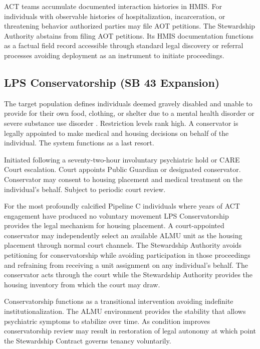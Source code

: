 \documentclass[12pt, letterpaper]{article}
\begin{document}
ACT teams accumulate documented interaction histories in HMIS. For individuals with observable histories of hospitalization, incarceration, or threatening behavior authorized parties may file AOT petitions. The Stewardship Authority abstains from filing AOT petitions. Its HMIS documentation functions as a factual field record accessible through standard legal discovery or referral processes avoiding deployment as an instrument to initiate proceedings.

\subsection{LPS Conservatorship (SB 43 Expansion)}

The target population defines individuals deemed gravely disabled and unable to provide for their own food, clothing, or shelter due to a mental health disorder or severe substance use disorder \citep{sb_43_2023}. Restriction levels rank high. A conservator is legally appointed to make medical and housing decisions on behalf of the individual. The system functions as a last resort.

Initiated following a seventy-two-hour involuntary psychiatric hold or CARE Court escalation. Court appoints Public Guardian or designated conservator. Conservator may consent to housing placement and medical treatment on the individual's behalf. Subject to periodic court review.

For the most profoundly calcified Pipeline C individuals where years of ACT engagement have produced no voluntary movement LPS Conservatorship provides the legal mechanism for housing placement. A court-appointed conservator may independently select an available ALMU unit as the housing placement through normal court channels. The Stewardship Authority avoids petitioning for conservatorship while avoiding participation in those proceedings and refraining from receiving a unit assignment on any individual's behalf. The conservator acts through the court while the Stewardship Authority provides the housing inventory from which the court may draw.

Conservatorship functions as a transitional intervention avoiding indefinite institutionalization. The ALMU environment provides the stability that allows psychiatric symptoms to stabilize over time. As condition improves conservatorship review may result in restoration of legal autonomy at which point the Stewardship Contract governs tenancy voluntarily.

\clearpage
\end{document}
